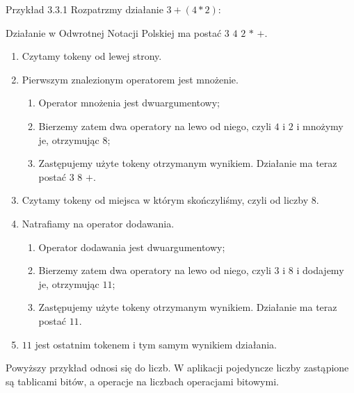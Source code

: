 \documentclass{SGGW-thesis}
\begin{document}
\begin{paragraph}{Przykład 3.3.1\label{ex:3.3.1}} Rozpatrzmy działanie $3 + (4 * 2):$
    
    Działanie w Odwrotnej Notacji Polskiej ma postać $3$ $4$ $2$ $*$ $+$.
    \begin{enumerate}
        \item Czytamy tokeny od lewej strony.
        \item Pierwszym znalezionym operatorem jest mnożenie.
        \begin{enumerate}
            \item Operator mnożenia jest dwuargumentowy;
            \item Bierzemy zatem dwa operatory na lewo od niego, czyli $4$ i $2$ i mnożymy je, otrzymując $8$;
            \item Zastępujemy użyte tokeny otrzymanym wynikiem. Działanie ma teraz postać $3$ $8$ $+$.
        \end{enumerate}
        \item Czytamy tokeny od miejsca w którym skończyliśmy, czyli od liczby $8$.
        \item Natrafiamy na operator dodawania.
        \begin{enumerate}
            \item Operator dodawania jest dwuargumentowy;
            \item Bierzemy zatem dwa operatory na lewo od niego, czyli $3$ i $8$ i dodajemy je, otrzymując $11$;
            \item Zastępujemy użyte tokeny otrzymanym wynikiem. Działanie ma teraz postać $11$.
        \end{enumerate}
        \item $11$ jest ostatnim tokenem i tym samym wynikiem działania. 
    \end{enumerate}

    Powyższy przykład odnosi się do liczb. W aplikacji pojedyncze liczby zastąpione są tablicami bitów, a operacje na liczbach operacjami bitowymi.


\end{paragraph}
\end{document}
